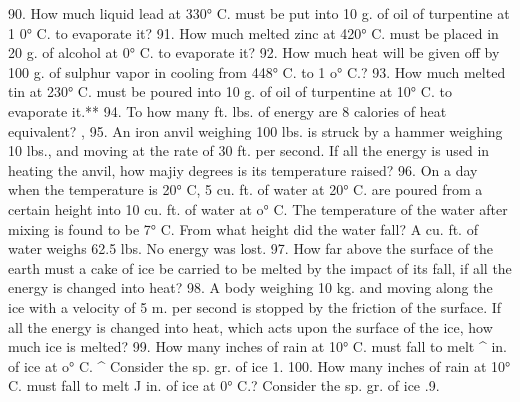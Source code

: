 90. How much liquid lead at 330° C. must be put into 10 g. of oil of turpentine at 1 0° C. to evaporate it?
91. How much melted zinc at 420° C. must be placed in 20 g. of alcohol at 0° C. to evaporate it?
92. How much heat will be given off by 100 g. of sulphur vapor in cooling from 448° C. to 1 o° C.?
93. How much melted tin at 230° C. must be poured into 10 g. of oil of turpentine at 10° C. to evaporate it.**
94. To how many ft. lbs. of energy are 8 calories of heat equivalent? ,
95. An iron anvil weighing 100 lbs. is struck by a hammer weighing 10 lbs., and moving at the rate of 30 ft. per second. If all the energy is used in heating the anvil, how majiy degrees is its temperature raised?
96. On a day when the temperature is 20° C, 5 cu. ft. of water at 20° C. are poured from a certain height into 10 cu. ft. of water at o° C. The temperature of the water after mixing is found to be 7° C. From what height did the water fall? A cu. ft. of water weighs 62.5 lbs. No energy was lost.
97. How far above the surface of the earth must a cake of ice be carried to be melted by the impact of its fall, if all the energy is changed into heat?
98. A body weighing 10 kg. and moving along the ice with a velocity of 5 m. per second is stopped by the friction of the surface. If all the energy is changed into heat, which acts upon the surface of the ice, how much ice is melted?
99. How many inches of rain at 10° C. must fall to melt ^ in. of ice at o° C. ^ Consider the sp. gr. of ice 1.
100. How many inches of rain at 10° C. must fall to melt J in. of ice at 0° C.? Consider the sp. gr. of ice .9.